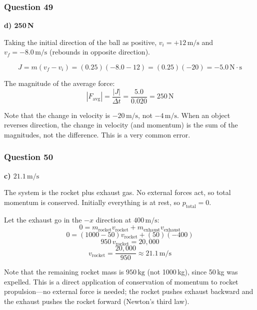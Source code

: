 \documentclass[12pt,letterpaper]{article}
\begin{document}
\subsubsection*{Question 49}

\begin{answerbox}
\textbf{d) 250\,N}
\end{answerbox}

\begin{explanationbox}
Taking the initial direction of the ball as positive, $v_i = +12\,\text{m/s}$ and $v_f = -8.0\,\text{m/s}$ (rebounds in opposite direction).

\[
J = m(v_f - v_i) = (0.25)(-8.0 - 12) = (0.25)(-20) = -5.0\,\text{N}\cdot\text{s}
\]

The magnitude of the average force:
\[
|F_{\text{avg}}| = \frac{|J|}{\Delta t} = \frac{5.0}{0.020} = 250\,\text{N}
\]

Note that the change in velocity is $-20\,\text{m/s}$, not $-4\,\text{m/s}$. When an object reverses direction, the change in velocity (and momentum) is the sum of the magnitudes, not the difference. This is a very common error.
\end{explanationbox}

\subsubsection*{Question 50}

\begin{answerbox}
\textbf{c) $21.1\,\text{m/s}$}
\end{answerbox}

\begin{explanationbox}
The system is the rocket plus exhaust gas. No external forces act, so total momentum is conserved. Initially everything is at rest, so $p_{\text{total}} = 0$.

Let the exhaust go in the $-x$ direction at $400\,\text{m/s}$:
\[
0 = m_{\text{rocket}} v_{\text{rocket}} + m_{\text{exhaust}} v_{\text{exhaust}}
\]
\[
0 = (1000 - 50)v_{\text{rocket}} + (50)(-400)
\]
\[
950\,v_{\text{rocket}} = 20{,}000
\]
\[
v_{\text{rocket}} = \frac{20{,}000}{950} \approx 21.1\,\text{m/s}
\]

Note that the remaining rocket mass is $950\,\text{kg}$ (not 1000\,kg), since 50\,kg was expelled. This is a direct application of conservation of momentum to rocket propulsion---no external force is needed; the rocket pushes exhaust backward and the exhaust pushes the rocket forward (Newton's third law).
\end{explanationbox}
\end{document}
